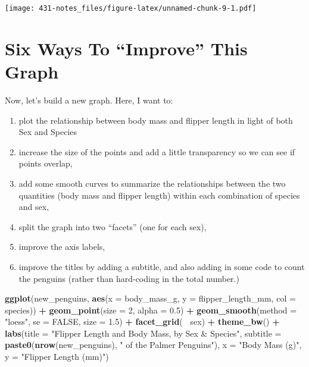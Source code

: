 \documentclass[
]{book}
\newenvironment{Shaded}{\begin{snugshade}}{\end{snugshade}}
\newcommand{\DataTypeTok}[1]{\textcolor[rgb]{0.13,0.29,0.53}{#1}}
\newcommand{\DecValTok}[1]{\textcolor[rgb]{0.00,0.00,0.81}{#1}}
\newcommand{\FloatTok}[1]{\textcolor[rgb]{0.00,0.00,0.81}{#1}}
\newcommand{\KeywordTok}[1]{\textcolor[rgb]{0.13,0.29,0.53}{\textbf{#1}}}
\newcommand{\NormalTok}[1]{#1}
\newcommand{\OperatorTok}[1]{\textcolor[rgb]{0.81,0.36,0.00}{\textbf{#1}}}
\newcommand{\OtherTok}[1]{\textcolor[rgb]{0.56,0.35,0.01}{#1}}
\newcommand{\StringTok}[1]{\textcolor[rgb]{0.31,0.60,0.02}{#1}}
\providecommand{\tightlist}{%
  \setlength{\itemsep}{0pt}\setlength{\parskip}{0pt}}
\begin{document}
\texttt{[image: 431-notes\_files/figure-latex/unnamed-chunk-9-1.pdf]}

\hypertarget{six-ways-to-improve-this-graph}{%
\section{Six Ways To ``Improve'' This Graph}\label{six-ways-to-improve-this-graph}}

Now, let's build a new graph. Here, I want to:

\begin{enumerate}
\def\labelenumi{\arabic{enumi}.}
\tightlist
\item
  plot the relationship between body mass and flipper length in light of both Sex and Species
\item
  increase the size of the points and add a little transparency so we can see if points overlap,
\item
  add some smooth curves to summarize the relationships between the two quantities (body mass and flipper length) within each combination of species and sex,
\item
  split the graph into two ``facets'' (one for each sex),
\item
  improve the axis labels,
\item
  improve the titles by adding a subtitle, and also adding in some code to count the penguins (rather than hard-coding in the total number.)
\end{enumerate}

\begin{Shaded}
\begin{Highlighting}[]
\KeywordTok{ggplot}\NormalTok{(new_penguins, }\KeywordTok{aes}\NormalTok{(}\DataTypeTok{x =}\NormalTok{ body_mass_g, }\DataTypeTok{y =}\NormalTok{ flipper_length_mm, }
                         \DataTypeTok{col =}\NormalTok{ species)) }\OperatorTok{+}
\StringTok{    }\KeywordTok{geom_point}\NormalTok{(}\DataTypeTok{size =} \DecValTok{2}\NormalTok{, }\DataTypeTok{alpha =} \FloatTok{0.5}\NormalTok{) }\OperatorTok{+}\StringTok{ }
\StringTok{    }\KeywordTok{geom_smooth}\NormalTok{(}\DataTypeTok{method =} \StringTok{"loess"}\NormalTok{, }\DataTypeTok{se =} \OtherTok{FALSE}\NormalTok{, }\DataTypeTok{size =} \FloatTok{1.5}\NormalTok{) }\OperatorTok{+}
\StringTok{    }\KeywordTok{facet_grid}\NormalTok{(}\OperatorTok{~}\StringTok{ }\NormalTok{sex) }\OperatorTok{+}
\StringTok{    }\KeywordTok{theme_bw}\NormalTok{() }\OperatorTok{+}\StringTok{ }
\StringTok{    }\KeywordTok{labs}\NormalTok{(}\DataTypeTok{title =} \StringTok{"Flipper Length and Body Mass, by Sex & Species"}\NormalTok{,}
         \DataTypeTok{subtitle =} \KeywordTok{paste0}\NormalTok{(}\KeywordTok{nrow}\NormalTok{(new_penguins), }\StringTok{" of the Palmer Penguins"}\NormalTok{),}
         \DataTypeTok{x =} \StringTok{"Body Mass (g)"}\NormalTok{, }
         \DataTypeTok{y =} \StringTok{"Flipper Length (mm)"}\NormalTok{)}
\end{Highlighting}
\end{Shaded}
\end{document}
